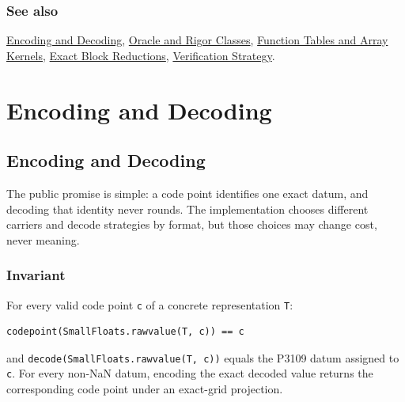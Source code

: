 \subsection{See also}



\label{292862844209942199-dup17}{}


\href{internals\_\allowbreak{}encoding\_\allowbreak{}decoding.md}{Encoding and Decoding}, \href{internals\_\allowbreak{}oracle.md}{Oracle and Rigor Classes}, \href{internals\_\allowbreak{}tables.md}{Function Tables and Array Kernels}, \href{internals\_\allowbreak{}blocks.md}{Exact Block Reductions}, \href{internals\_\allowbreak{}verification.md}{Verification Strategy}.



\chapter{Encoding and Decoding}


\section{Encoding and Decoding}



\label{16854397268117187084}{}


The public promise is simple: a code point identifies one exact datum, and decoding that identity never rounds. The implementation chooses different carriers and decode strategies by format, but those choices may change cost, never meaning.



\subsection{Invariant}



\label{15514665402246116789}{}


For every valid code point \texttt{c} of a concrete representation \texttt{T}:




\nopagebreak[4]
\begin{verbatim}
codepoint(SmallFloats.rawvalue(T, c)) == c
\end{verbatim}



and \texttt{decode(\allowbreak{}SmallFloats.rawvalue(\allowbreak{}T, c))} equals the P3109 datum assigned to \texttt{c}. For every non-NaN datum, encoding the exact decoded value returns the corresponding code point under an exact-grid projection.



